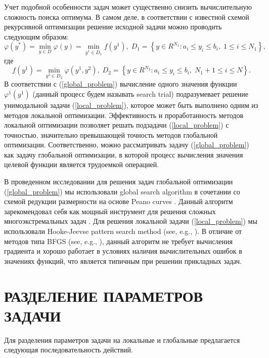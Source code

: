 \documentclass{aip-cp}
\begin{document}
Учет подобной особенности задач может существенно снизить вычислительную сложность поиска оптимума. В самом деле, в соответствии с известной схемой рекурсивной оптимизации \cite{Carr} решение исходной задачи можно проводить следующим образом:
\begin{equation}\label{global_problem}
\varphi(y^*) = \min_{y\in D} \varphi (y) = \min_{y^1\in D_1} f(y^1), \; D_1=\left\{y\in R^{N_1}: a_i\leq y_i \leq b_i, \; 1\leq i \leq N_1\right\},
\end{equation}
где 
\begin{equation}\label{local_problem}
f(y^1) = \min_{ y^2 \in D_2} \varphi(y^1,y^2), \; D_2=\left\{y\in R^{N_2}: a_i\leq y_i \leq b_i, \; N_1+1\leq i \leq N\right\}.
\end{equation}
В соответствии с (\ref{global_problem}) вычисление одного значения функции $\varphi^1 (y^1)$ (данный процесс будем называть search trial) подразумевает решение унимодальной задачи (\ref{local_problem}), которое может быть выполнено одним из методов локальной оптимизации. Эффективность и проработанность методов локальной оптимизации позволяет решать подзадачи (\ref{local_problem}) с точностью, значительно превышающей точность методов глобальной оптимизации. Соответственно, можно рассматривать задачу (\ref{global_problem}) как задачу глобальной оптимизации, в которой процесс вычисления значения целевой функции является трудоемкой операцией. 

В проведенном исследовании для решения задач глобальной оптимизации (\ref{global_problem}) мы использовали global search algorithm в сочетании со схемой редукции размерности на основе Peano curves \cite{Sergeyev2013,Lera2021}. Данный алгоритм зарекомендовал себя как мощный инструмент для решения сложных многоэкстремальных задач \cite{Kvasov2013,Kalyulin2017,Cavoretto2021}.
Для решения локальной задачи (\ref{local_problem}) мы использовали Hooke-Jeevse pattern search method (see, e.g., \cite{Kelley}). В отличие от методов типа BFGS (see, e.g., \cite{Nocedal}), данный алгоритм не требует вычисления градиента и хорошо работает в условиях наличия вычислительных ошибок в значениях функций, что является типичным при решении прикладных задач.

\section{РАЗДЕЛЕНИЕ ПАРАМЕТРОВ ЗАДАЧИ}

Для разделения параметров задачи на локальные и глобальные предлагается следующая последовательность действий.
\end{document}
